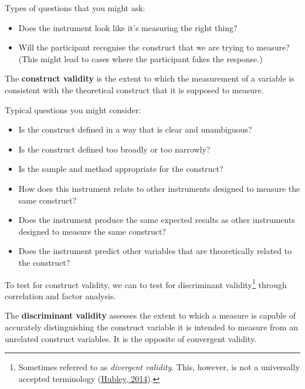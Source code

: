 \documentclass[
  11pt,
  a4paper,
  twoside,symmetric,openright]{book}
\providecommand{\tightlist}{%
  \setlength{\itemsep}{0pt}\setlength{\parskip}{0pt}}
\theoremstyle{break}
\theoremstyle{break}
\begin{document}
Types of questions that you might ask:

\begin{itemize}
\tightlist
\item
  Does the instrument look like it's measuring the right thing?
\item
  Will the participant recognise the construct that we are trying to measure? (This might lead to cases where the participant fakes the response.)
\end{itemize}

\begin{definition}
\protect\hypertarget{def:defconstructvalidity}{}\label{def:defconstructvalidity}The \textbf{construct validity} is the extent to which the measurement of a variable is consistent with the theoretical construct that it is supposed to measure.
\end{definition}

Typical questions you might consider:

\begin{itemize}
\tightlist
\item
  Is the construct defined in a way that is clear and unambiguous?
\item
  Is the construct defined too broadly or too narrowly?
\item
  Is the sample and method appropriate for the construct?
\item
  How does this instrument relate to other instruments designed to measure the same construct?
\item
  Does the instrument produce the same expected results as other instruments designed to measure the same construct?
\item
  Does the instrument predict other variables that are theoretically related to the construct?
\end{itemize}

To test for construct validity, we can to test for discriminant validity\footnote{Sometimes referred to as \emph{divergent validity}. This, however, is not a universally accepted terminology (\protect\hyperlink{ref-hubleyDivergentValidity2014}{Hubley, 2014}).} through correlation and factor analysis.

\begin{definition}
\protect\hypertarget{def:defdiscriminantvalidity}{}\label{def:defdiscriminantvalidity}The \textbf{discriminant validity} assesses the extent to which a measure is capable of accurately distinguishing the construct variable it is intended to measure from an unrelated construct variables. It is the opposite of convergent validity.
\end{definition}
\end{document}
